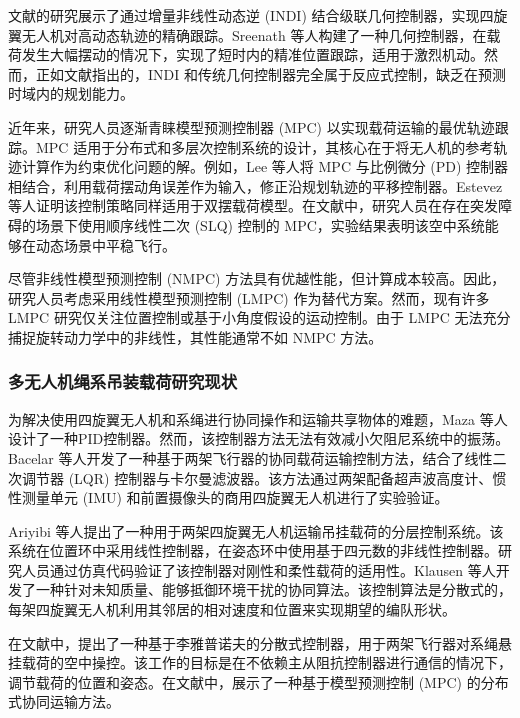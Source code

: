 \documentclass[lang=chs, degree=master, blindreview=false, winfonts=true]{yanputhesis}
\begin{document}
文献\cite{2021Accurate}的研究展示了通过增量非线性动态逆 (INDI) 结合级联几何控制器，实现四旋翼无人机对高动态轨迹的精确跟踪。Sreenath 等人\cite{sreenath2013geometric}构建了一种几何控制器，在载荷发生大幅摆动的情况下，实现了短时内的精准位置跟踪，适用于激烈机动。然而，正如文献\cite{torrente2021data,sun2022comparative}指出的，INDI 和传统几何控制器完全属于反应式控制，缺乏在预测时域内的规划能力。

近年来，研究人员逐渐青睐模型预测控制器 (MPC) 以实现载荷运输的最优轨迹跟踪\cite{urbina2021predictive}。MPC 适用于分布式和多层次控制系统的设计，其核心在于将无人机的参考轨迹计算作为约束优化问题的解。例如，Lee 等人\cite{lee2015study}将 MPC 与比例微分 (PD) 控制器相结合，利用载荷摆动角误差作为输入，修正沿规划轨迹的平移控制器。Estevez 等人\cite{estevez2021hybrid}证明该控制策略同样适用于双摆载荷模型。在文献\cite{son2018model}中，研究人员在存在突发障碍的场景下使用顺序线性二次 (SLQ) 控制的 MPC，实验结果表明该空中系统能够在动态场景中平稳飞行。

尽管非线性模型预测控制 (NMPC) 方法具有优越性能，但计算成本较高\cite{norouzi2022deep}。因此，研究人员考虑采用线性模型预测控制 (LMPC) 作为替代方案。然而，现有许多 LMPC 研究仅关注位置控制\cite{bangura2014real}或基于小角度假设的运动控制\cite{alexis2014trajectory}。由于 LMPC 无法充分捕捉旋转动力学中的非线性，其性能通常不如 NMPC 方法\cite{nguyen2021model}。

\subsubsection{多无人机绳系吊装载荷研究现状}
为解决使用四旋翼无人机和系绳进行协同操作和运输共享物体的难题，Maza 等人\cite{maza2010multi}设计了一种PID控制器。然而，该控制器方法无法有效减小欠阻尼系统中的振荡。Bacelar 等人开发了一种基于两架飞行器的协同载荷运输控制方法\cite{bacelar2020board}，结合了线性二次调节器 (LQR) 控制器与卡尔曼滤波器。该方法通过两架配备超声波高度计、惯性测量单元 (IMU) 和前置摄像头的商用四旋翼无人机进行了实验验证。

Ariyibi 等人\cite{ariyibi2020quaternion}提出了一种用于两架四旋翼无人机运输吊挂载荷的分层控制系统。该系统在位置环中采用线性控制器，在姿态环中使用基于四元数的非线性控制器。研究人员通过仿真代码验证了该控制器对刚性和柔性载荷的适用性。Klausen 等人\cite{klausen2018cooperative}开发了一种针对未知质量、能够抵御环境干扰的协同算法。该控制算法是分散式的，每架四旋翼无人机利用其邻居的相对速度和位置来实现期望的编队形状。

在文献\cite{tognon2018aerial}中，提出了一种基于李雅普诺夫的分散式控制器，用于两架飞行器对系绳悬挂载荷的空中操控。该工作的目标是在不依赖主从阻抗控制器进行通信的情况下，调节载荷的位置和姿态。在文献\cite{wehbeh2020distributed}中，展示了一种基于模型预测控制 (MPC) 的分布式协同运输方法。
\end{document}
